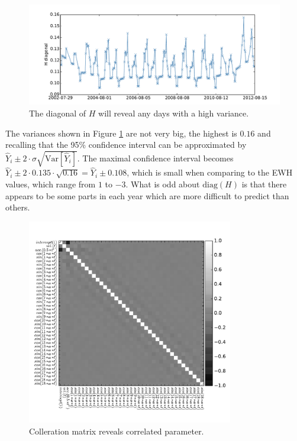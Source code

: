 \begin{figure}[H]
	\centering
	\includegraphics[width=\textwidth]{figures/ols-world-diagnostics-diagH}
	\caption{The diagonal of $H$ will reveal any days with a high variance.}
	\label{fig:ols-world-performance-diagH}
\end{figure}

The variances shown in Figure \ref{fig:ols-world-performance-diagH} are not very big, the highest is $0.16$ and recalling that the 95\% confidence interval can be approximated by $\hat{Y}_i \pm 2 \cdot \hat{\sigma} \sqrt{\mathrm{Var}[\hat{Y}_i]}$. The maximal confidence interval becomes $\hat{Y}_i \pm 2 \cdot 0.135 \cdot \sqrt{0.16} = \hat{Y}_i \pm 0.108$, which is small when comparing to the EWH values, which range from $1$ to $-3$. What is odd about $\mathrm{diag}(H)$ is that there appears to be some parts in each year which are more difficult to predict than others.

\begin{figure}[H]
	\centering
	\includegraphics[height=9cm]{figures/ols-world-diagnostics-cov}
	\caption{Colleration matrix reveals correlated parameter.}
	\label{fig:ols-world-performance-cov}
\end{figure}

